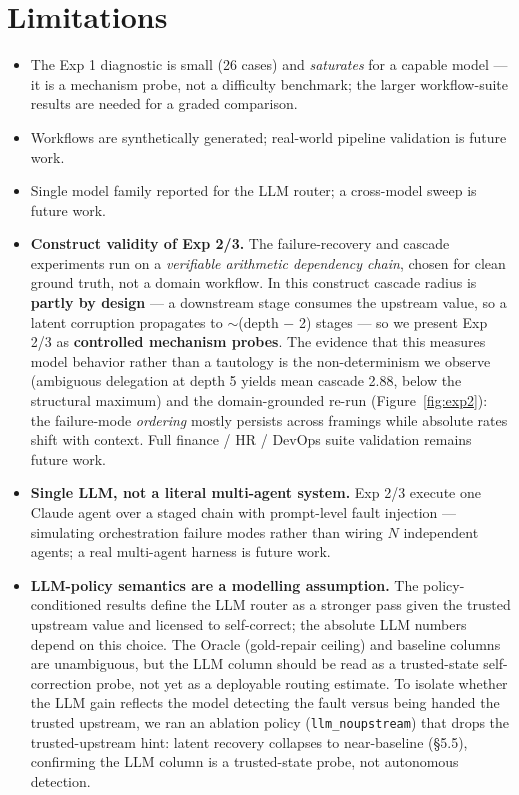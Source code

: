 \documentclass[sigconf,nonacm,anonymous]{acmart}  %
\begin{document}
\section{Limitations}
\label{sec:limitations}
\begin{itemize}
  \item The Exp 1 diagnostic is small (26 cases) and \emph{saturates} for a
  capable model --- it is a mechanism probe, not a difficulty benchmark; the
  larger workflow-suite results are needed for a graded comparison.
  \item Workflows are synthetically generated; real-world pipeline validation is
  future work.
  \item Single model family reported for the LLM router; a cross-model sweep is
  future work.
  \item \textbf{Construct validity of Exp 2/3.} The failure-recovery and cascade
  experiments run on a \emph{verifiable arithmetic dependency chain}, chosen for
  clean ground truth, not a domain workflow. In this construct cascade radius is
  \textbf{partly by design} --- a downstream stage consumes the upstream value,
  so a latent corruption propagates to $\sim$(depth $-$ 2) stages --- so we
  present Exp 2/3 as \textbf{controlled mechanism probes}. The evidence that this
  measures model behavior rather than a tautology is the
  non-determinism we observe (ambiguous delegation at depth 5 yields
  mean cascade 2.88, below the structural maximum) and the domain-grounded re-run
  (Figure~\ref{fig:exp2}): the failure-mode \emph{ordering} mostly persists
  across framings while absolute rates shift with context. Full finance /
  HR / DevOps suite validation remains future work.
  \item \textbf{Single LLM, not a literal multi-agent system.} Exp 2/3 execute one
  Claude agent over a staged chain with prompt-level fault injection ---
  simulating orchestration failure modes rather than wiring $N$ independent
  agents; a real multi-agent harness is future work.
  \item \textbf{LLM-policy semantics are a modelling assumption.} The
  policy-conditioned results define the LLM router as a stronger pass given the
  trusted upstream value and licensed to self-correct; the absolute LLM numbers
  depend on this choice. The Oracle (gold-repair ceiling) and baseline columns
  are unambiguous, but the LLM column should be read as a trusted-state
  self-correction probe, not yet as a deployable routing estimate. To isolate whether
  the LLM gain reflects the model detecting the fault versus being handed the trusted
  upstream, we ran an ablation policy (\texttt{llm\_noupstream}) that drops the
  trusted-upstream hint: latent recovery collapses to near-baseline (\S5.5), confirming
  the LLM column is a trusted-state probe, not autonomous detection.
\end{itemize}
\end{document}
